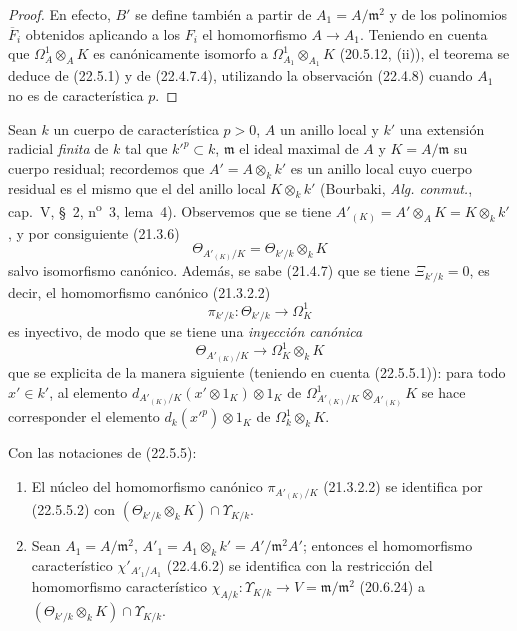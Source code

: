 \begin{proof}
En efecto, $B'$ se define también a partir de $A_1=A/\mathfrak m^2$ y de los
polinomios $\overline F_i$ obtenidos aplicando a los $F_i$ el homomorfismo
$A\longrightarrow A_1$. Teniendo en cuenta que $\Omega^1_A\otimes_AK$ es
canónicamente isomorfo a $\Omega^1_{A_1}\otimes_{A_1}K$ (20.5.12, (ii)), el
teorema se deduce de (22.5.1) y de (22.4.7.4), utilizando la observación
(22.4.8) cuando $A_1$ no es de característica $p$.
\end{proof}


\begin{env}[22.5.5]
\label{0.22.5.5-fr}
Sean $k$ un cuerpo de característica $p>0$, $A$ un anillo local y $k'$ una
extensión radicial \emph{finita} de $k$ tal que $k'^p\subset k$,
$\mathfrak m$ el ideal maximal de $A$ y $K=A/\mathfrak m$ su cuerpo residual;
recordemos que $A'=A\otimes_kk'$ es un anillo local cuyo cuerpo residual es
el mismo que el del anillo local $K\otimes_kk'$ (Bourbaki,
\emph{Alg. conmut.}, cap.~V, §~2, n\textsuperscript{o}~3, lema~4). Observemos que
se tiene $A'_{(K)}=A'\otimes_AK=K\otimes_kk'$, y por consiguiente (21.3.6)
\begin{equation}
\label{0.22.5.5.1-fr}
  \Theta_{A'_{(K)}/K}=\Theta_{k'/k}\otimes_kK
  \tag{22.5.5.1}
\end{equation}
salvo isomorfismo canónico. Además, se sabe (21.4.7) que se tiene
$\Xi_{k'/k}=0$, es decir, el homomorfismo canónico (21.3.2.2)
\[
  \pi_{k'/k}:\Theta_{k'/k}\longrightarrow\Omega^1_K
\]
es inyectivo, de modo que se tiene una \emph{inyección canónica}
\begin{equation}
\label{0.22.5.5.2-fr}
  \Theta_{A'_{(K)}/K}\longrightarrow\Omega^1_K\otimes_kK
  \tag{22.5.5.2}
\end{equation}
que se explicita de la manera siguiente (teniendo en cuenta (22.5.5.1)): para todo
$x'\in k'$, al elemento
$d_{A'_{(K)}/K}(x'\otimes1_K)\otimes1_K$ de
$\Omega^1_{A'_{(K)}/K}\otimes_{A'_{(K)}}K$ se hace corresponder el elemento
$d_k(x'^p)\otimes1_K$ de $\Omega^1_k\otimes_kK$.
\end{env}

\begin{lemma}[22.5.6]
\label{0.22.5.6-fr}
Con las notaciones de \textup{(22.5.5)}:
\begin{enumerate}
  \item[\rm(i)] El núcleo del homomorfismo canónico
  $\pi_{A'_{(K)}/K}$ \textup{(21.3.2.2)} se identifica por \textup{(22.5.5.2)} con
  $(\Theta_{k'/k}\otimes_kK)\cap\Upsilon_{K/k}$.
  \item[\rm(ii)] Sean $A_1=A/\mathfrak m^2$,
  $A'_1=A_1\otimes_kk'=A'/\mathfrak m^2A'$; entonces el homomorfismo
  característico $\chi'_{A'_1/A_1}$ \textup{(22.4.6.2)} se identifica con la restricción del
  homomorfismo característico
  $\chi_{A/k}:\Upsilon_{K/k}\longrightarrow V=\mathfrak m/\mathfrak m^2$
  \textup{(20.6.24)} a $(\Theta_{k'/k}\otimes_kK)\cap\Upsilon_{K/k}$.
\end{enumerate}
\end{lemma}


